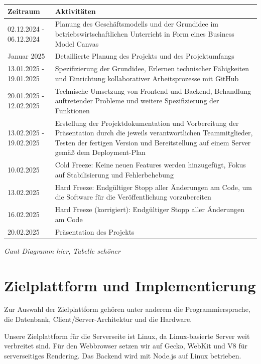 \documentclass[a4paper,12pt]{article}
\begin{document}
\newpage
\begin{longtable}{|p{4cm}|p{11cm}|}
	\hline
	\textbf{Zeitraum} & \textbf{Aktivitäten} \\
	\hline
	02.12.2024 - 06.12.2024 & Planung des Geschäftsmodells und der Grundidee im betriebswirtschaftlichen Unterricht in Form eines Business Model Canvas \\
	\hline
	Januar 2025 & Detaillierte Planung des Projekts und des Projektumfangs \\
	\hline
	13.01.2025 - 19.01.2025 & Spezifizierung der Grundidee, Erlernen technischer Fähigkeiten und Einrichtung kollaborativer Arbeitsprozesse mit GitHub \\
	\hline
	20.01.2025 - 12.02.2025 & Technische Umsetzung von Frontend und Backend, Behandlung auftretender Probleme und weitere Spezifizierung der Funktionen \\
	\hline
	13.02.2025 - 19.02.2025 & Erstellung der Projektdokumentation und Vorbereitung der Präsentation durch die jeweils verantwortlichen Teammitglieder, Testen der fertigen Version und Bereitstellung auf einem Server gemäß dem Deployment-Plan \\
	\hline
	10.02.2025 & Cold Freeze: Keine neuen Features werden hinzugefügt, Fokus auf Stabilisierung und Fehlerbehebung \\
	\hline
	13.02.2025 & Hard Freeze: Endgültiger Stopp aller Änderungen am Code, um die Software für die Veröffentlichung vorzubereiten \\
	\hline
	16.02.2025 & Hard Freeze (korrigiert): Endgültiger Stopp aller Änderungen am Code \\
	\hline
	20.02.2025 & Präsentation des Projekts \\
	\hline
\end{longtable}

\textit{
Gant Diagramm hier, Tabelle schöner
}

\newpage \section{Zielplattform und Implementierung}
Zur Auswahl der Zielplattform gehören unter anderem die Programmiersprache, die Datenbank, Client/Server-Architektur und die Hardware. 

Unsere Zielplattform für die Serverseite ist Linux, da Linux-basierte Server weit verbreitet sind. Für den Webbrowser setzen wir auf Gecko, WebKit und V8 für serverseitiges Rendering. Das Backend wird mit Node.js auf Linux betrieben.
\end{document}
